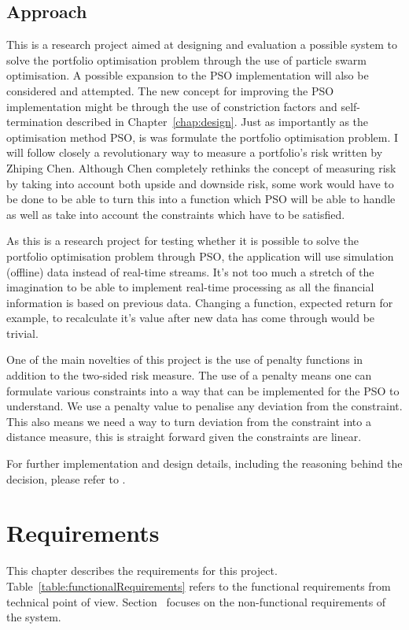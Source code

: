 \documentclass{pdfmx4020}
\begin{document}

  \section{Approach} %
  \label{sec:approach}
  This is a research project aimed at designing and evaluation a possible system to solve the portfolio optimisation problem through the use of particle swarm optimisation. A possible expansion to the PSO implementation \cite{haskellPSO} will also be considered and attempted. The new concept for improving the PSO implementation might be through the use of constriction factors and self-termination described in Chapter~\ref{chap:design}. Just as importantly as the optimisation method PSO, is was formulate the portfolio optimisation problem. I will follow closely a revolutionary way to measure a portfolio's risk \cite{two_sided_risk} written by Zhiping Chen. Although Chen completely rethinks the concept of measuring risk by taking into account both upside and downside risk, some work would have to be done to be able to turn this into a function which PSO will be able to handle as well as take into account the constraints which have to be satisfied. 

  As this is a research project for testing whether it is possible to solve the portfolio optimisation problem through PSO, the application will use simulation (offline) data instead of real-time streams. It's not too much a stretch of the imagination to be able to implement real-time processing as all the financial information is based on previous data. Changing a function, expected return for example, to recalculate it's value after new data has come through would be trivial. 

  One of the main novelties of this project is the use of penalty functions in addition to the two-sided risk measure. The use of a penalty means one can formulate various constraints into a way that can be implemented for the PSO to understand. We use a penalty value to penalise any deviation from the constraint. This also means we need a way to turn deviation from the constraint into a distance measure, this is straight forward given the constraints are linear. 

  For further implementation and design details, including the reasoning behind the decision, please refer to .

\chapter{Requirements}
This chapter describes the requirements for this project. Table~\ref{table:functionalRequirements} refers to the functional requirements from technical point of view. Section~ focuses on the non-functional requirements of the system.
\end{document}
